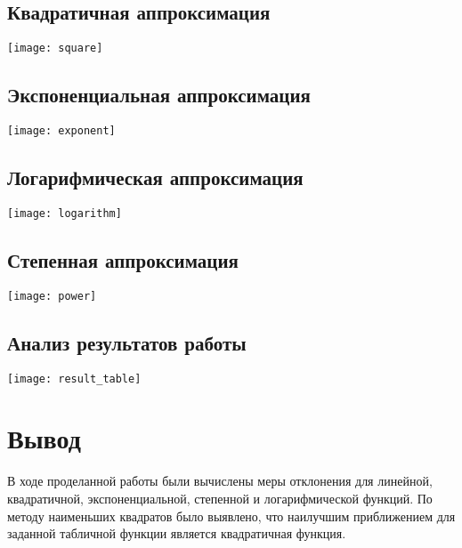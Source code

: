 \documentclass[12pt, a4paper]{article}
\begin{document}
\subsection*{Квадратичная аппроксимация}
\texttt{[image: square]}
\subsection*{Экспоненциальная аппроксимация}
\texttt{[image: exponent]}
\subsection*{Логарифмическая аппроксимация}
\texttt{[image: logarithm]}
\subsection*{Степенная аппроксимация}
\texttt{[image: power]}
\subsection*{Анализ результатов работы}
\texttt{[image: result\_table]}

\section*{Вывод}
В ходе проделанной работы были вычислены меры отклонения для линейной,
квадратичной, экспоненциальной, степенной и логарифмической функций.
По методу наименьших квадратов было выявлено, что наилучшим приближением для
заданной табличной функции является квадратичная функция.
\end{document}
